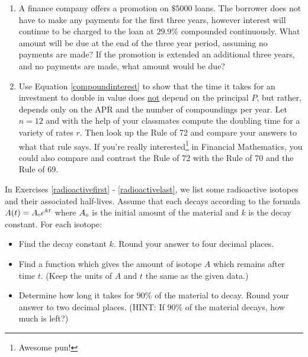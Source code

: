\documentclass{ximera}
\begin{document}
\begin{enumerate}
\begin{enumerate}
\end{enumerate}


\item  A finance company offers a promotion on $\$5000$ loans.  The borrower does not have to make any payments for the first three years, however interest will continue to be charged to the loan at $29.9 \%$ compounded continuously.  What amount will be due at the end of the three year period, assuming no payments are made?  If the promotion is extended an additional three years, and no payments are made, what amount would be due?

\item Use Equation \ref{compoundinterest} to show that the time it takes for an investment to double in value does \underline{not} depend on the principal $P$, but rather, depends only on the APR and the number of compoundings per year.  Let $n = 12$ and with the help of your classmates compute the doubling time for a variety of rates $r$.  Then look up the Rule of 72 and compare your answers to what that rule says.  If you're really interested\footnote{Awesome pun!} in Financial Mathematics, you could also compare and contrast the Rule of 72 with the Rule of 70 and the Rule of 69.

\setcounter{HW}{\value{enumi}}
\end{enumerate}

In Exercises \ref{radioactivefirst} - \ref{radioactivelast},  we list some radioactive isotopes and their associated half-lives.  Assume that each decays according to the formula $A(t) = A_{\text{\tiny $0$}}e^{kt}$ where $A_{\text{\tiny $0$}}$ is the initial amount of the material and $k$ is the decay constant. For each isotope:

\begin{itemize}

\item  Find the decay constant $k$.  Round your answer to four decimal places.

\item  Find a function which gives the amount of isotope $A$ which remains after time $t$.  (Keep the units of $A$ and $t$ the same as the given data.)

\item  Determine how long it takes for $90 \%$ of the material to decay.  Round your answer to two decimal places.  (HINT:  If $90 \%$ of the material decays, how much is left?)

\end{itemize}
\end{document}
